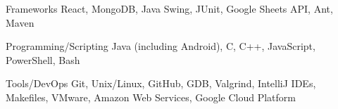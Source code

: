 

\begin{cvskills}

  \cvskill
    {Frameworks} %
    {React, MongoDB, Java Swing, JUnit, Google Sheets API, Ant, Maven} %

  \cvskill
    {Programming/Scripting} %
    {Java (including Android), C, C++, JavaScript, PowerShell, Bash} %
    
  \cvskill
    {Tools/DevOps} %
    {Git, Unix/Linux, GitHub, GDB, Valgrind, IntelliJ IDEs, Makefiles, VMware, Amazon Web Services, Google Cloud Platform} %

\end{cvskills}
